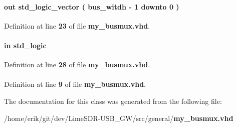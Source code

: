 \paragraph[{result}]{ {\bfseries \textcolor{keywordflow}{out}\textcolor{vhdlchar}{ }} {\bfseries \textcolor{comment}{std\+\_\+logic\+\_\+vector}\textcolor{vhdlchar}{ }\textcolor{vhdlchar}{(}\textcolor{vhdlchar}{ }\textcolor{vhdlchar}{ }\textcolor{vhdlchar}{ }\textcolor{vhdlchar}{ }{\bfseries {\bf bus\+\_\+witdh}} \textcolor{vhdlchar}{-\/}\textcolor{vhdlchar}{ } \textcolor{vhdldigit}{1} \textcolor{vhdlchar}{ }\textcolor{keywordflow}{downto}\textcolor{vhdlchar}{ }\textcolor{vhdlchar}{ } \textcolor{vhdldigit}{0} \textcolor{vhdlchar}{ }\textcolor{vhdlchar}{)}\textcolor{vhdlchar}{ }} \hspace{0.3cm}{\ttfamily [Port]}}\label{classmy__busmux_ac37dfc3d669d6a3f481b731990bf072d}


Definition at line {\bf 23} of file {\bf my\+\_\+busmux.\+vhd}.

\paragraph[{sel}]{ {\bfseries \textcolor{keywordflow}{in}\textcolor{vhdlchar}{ }} {\bfseries \textcolor{comment}{std\+\_\+logic}\textcolor{vhdlchar}{ }} \hspace{0.3cm}{\ttfamily [Port]}}\label{classmy__busmux_aee742c30d698f0d63527f641199e15f5}


Definition at line {\bf 28} of file {\bf my\+\_\+busmux.\+vhd}.

\paragraph[{std\+\_\+logic\+\_\+1164}]{\hspace{0.3cm}{\ttfamily [Package]}}\label{classmy__busmux_acd03516902501cd1c7296a98e22c6fcb}


Definition at line {\bf 9} of file {\bf my\+\_\+busmux.\+vhd}.



The documentation for this class was generated from the following file\+:\begin{DoxyCompactItemize}
\item 
/home/erik/git/dev/\+Lime\+S\+D\+R-\/\+U\+S\+B\+\_\+\+G\+W/src/general/{\bf my\+\_\+busmux.\+vhd}\end{DoxyCompactItemize}

